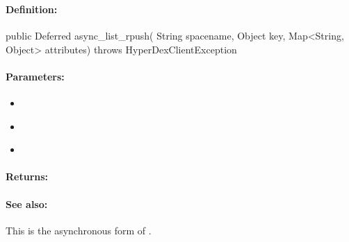 \pagebreak
\subsubsection{}
\label{api:java:async_list_rpush}


\paragraph{Definition:}
\begin{javacode}
public Deferred async_list_rpush(
        String spacename,
        Object key,
        Map<String, Object> attributes) throws HyperDexClientException
\end{javacode}

\paragraph{Parameters:}
\begin{itemize}[noitemsep]
\item {}\\

\item {}\\

\item {}\\

\end{itemize}

\paragraph{Returns:}


\paragraph{See also:}  This is the asynchronous form of .

\pagebreak
\subsubsection{}
\label{api:java:cond_list_rpush}


